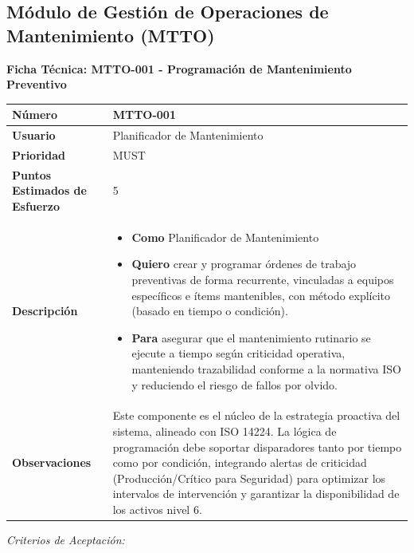 \subsection{Módulo de Gestión de Operaciones de Mantenimiento (MTTO)}
\noindent\textbf{Ficha Técnica: MTTO-001 - Programación de Mantenimiento Preventivo}
\footnotesize\setlength{\tabcolsep}{4pt}\renewcommand{\arraystretch}{1.2}
\begin{longtable}{|p{0.21\textwidth}|p{0.74\textwidth}|}\hline
\textbf{Número} & MTTO-001 \\ \hline
\textbf{Usuario} & Planificador de Mantenimiento \\ \hline
\textbf{Prioridad} & MUST \\ \hline
\textbf{Puntos Estimados de Esfuerzo} & 5 \\ \hline
\textbf{Descripción} & \parbox[t]{\linewidth}{\vspace{2pt}\begin{itemize}[leftmargin=1.5em, nosep, topsep=0pt]
\item \textbf{Como} Planificador de Mantenimiento
\item \textbf{Quiero} crear y programar órdenes de trabajo preventivas de forma recurrente, vinculadas a equipos específicos e ítems mantenibles, con método explícito (basado en tiempo o condición).
\item \textbf{Para} asegurar que el mantenimiento rutinario se ejecute a tiempo según criticidad operativa, manteniendo trazabilidad conforme a la normativa ISO y reduciendo el riesgo de fallos por olvido.
\end{itemize}\vspace{2pt}} \\ \hline
\textbf{Observaciones} & Este componente es el núcleo de la estrategia proactiva del sistema, alineado con ISO 14224. La lógica de programación debe soportar disparadores tanto por tiempo como por condición, integrando alertas de criticidad (Producción/Crítico para Seguridad) para optimizar los intervalos de intervención y garantizar la disponibilidad de los activos nivel 6. \\ \hline
\end{longtable}\normalsize
\noindent\textit{Criterios de Aceptación:}
